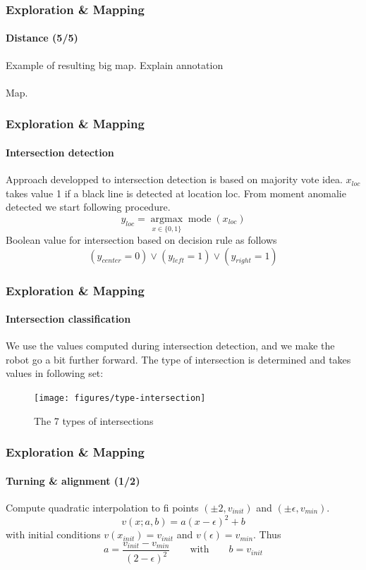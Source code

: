 \documentclass[10pt]{beamer}
\begin{document}

\begin{frame}
\frametitle{Exploration \& Mapping}
\framesubtitle{Distance (5/5)}
Example of resulting big map. Explain annotation\\~\\
Map.
\end{frame}


\begin{frame}
\frametitle{Exploration \& Mapping}
\framesubtitle{Intersection detection}
Approach developped to intersection detection is based on majority vote idea. $x_{loc}$ takes value 1 if a black line is detected at location loc. From moment anomalie detected we start following procedure.
$$
y_{loc} = \underset{x \in  \{0,1\}}{\operatorname{argmax}} \operatorname{mode}(x_{loc})
$$
Boolean value for intersection based on decision rule as follows
$$
(y_{center} = 0) \lor (y_{left} = 1) \lor (y_{right} = 1) 
$$
\end{frame}


\begin{frame}
\frametitle{Exploration \& Mapping}
\framesubtitle{Intersection classification}
We use the values computed during intersection detection, and we make the robot go a bit further forward. The type of intersection is determined and takes values in following set:
\begin{figure}[hbtp]
\centering
\label{fig:type-intersection}
\texttt{[image: figures/type-intersection]}
\caption{The 7 types of intersections}
\end{figure}
\end{frame}


\begin{frame}
\frametitle{Exploration \& Mapping}
\framesubtitle{Turning \& alignment (1/2)}
Compute quadratic interpolation to fi points $(\pm2,v_{init})$ and $(\pm\epsilon,v_{min})$.
$$
v(x;a,b) = a(x-\epsilon)^2+b 
$$
with initial conditions $v(x_{init}) = v_{init}$ and $v(\epsilon) = v_{min}$. Thus
$$
a = \frac{v_{init}-v_{min}}{(2-\epsilon)^2}
\qquad\text{with}\qquad
b = v_{init}
$$
\end{frame}
\end{document}
